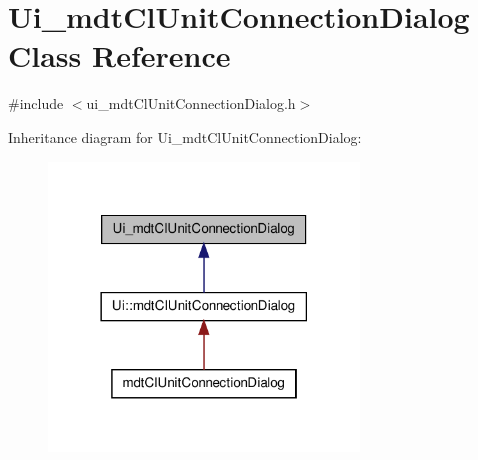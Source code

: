 \hypertarget{class_ui__mdt_cl_unit_connection_dialog}{\section{Ui\-\_\-mdt\-Cl\-Unit\-Connection\-Dialog Class Reference}
\label{class_ui__mdt_cl_unit_connection_dialog}
}


{\ttfamily \#include $<$ui\-\_\-mdt\-Cl\-Unit\-Connection\-Dialog.\-h$>$}



Inheritance diagram for Ui\-\_\-mdt\-Cl\-Unit\-Connection\-Dialog\-:\nopagebreak
\begin{figure}[H]
\begin{center}
\leavevmode
\includegraphics[width=234pt]{class_ui__mdt_cl_unit_connection_dialog__inherit__graph}
\end{center}
\end{figure}


